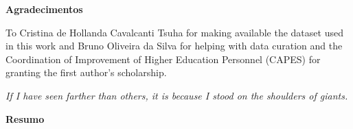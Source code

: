 \cleardoublepage\newpage{}
\begin{center}
\Large\textbf{Agradecimentos\\}
\end{center}
\vspace{5.0cm}
\begin{onehalfspace}
{To Cristina de Hollanda Cavalcanti Tsuha for making available the dataset used in this work and Bruno Oliveira da Silva for helping with data curation and the Coordination of Improvement of Higher Education Personnel (CAPES) for granting the first author’s scholarship.\\}
\end{onehalfspace}


\cleardoublepage\newpage
\begin{flushright}
\emph{If I have seen farther than others, it is because I stood on
the shoulders of giants.}
\end{flushright}



\cleardoublepage\newpage
\begin{center}
\Large\textbf{Resumo\\}
\end{center}
\vspace{1.0cm}
\begin{singlespace}
\end{singlespace}



